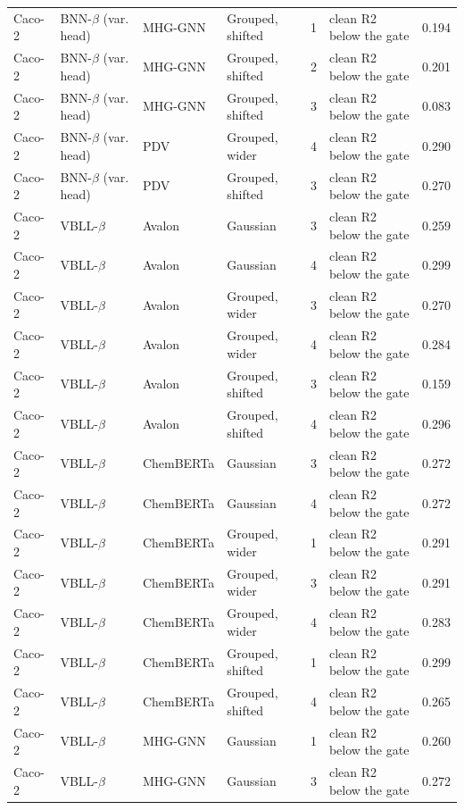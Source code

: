 {\begin{longtable}{llllcll}
Caco-2 & BNN-$\beta$ (var. head) & MHG-GNN & Grouped, shifted & 1 & clean R2 below the gate & 0.194 \\
Caco-2 & BNN-$\beta$ (var. head) & MHG-GNN & Grouped, shifted & 2 & clean R2 below the gate & 0.201 \\
Caco-2 & BNN-$\beta$ (var. head) & MHG-GNN & Grouped, shifted & 3 & clean R2 below the gate & 0.083 \\
Caco-2 & BNN-$\beta$ (var. head) & PDV & Grouped, wider & 4 & clean R2 below the gate & 0.290 \\
Caco-2 & BNN-$\beta$ (var. head) & PDV & Grouped, shifted & 3 & clean R2 below the gate & 0.270 \\
Caco-2 & VBLL-$\beta$ & Avalon & Gaussian & 3 & clean R2 below the gate & 0.259 \\
Caco-2 & VBLL-$\beta$ & Avalon & Gaussian & 4 & clean R2 below the gate & 0.299 \\
Caco-2 & VBLL-$\beta$ & Avalon & Grouped, wider & 3 & clean R2 below the gate & 0.270 \\
Caco-2 & VBLL-$\beta$ & Avalon & Grouped, wider & 4 & clean R2 below the gate & 0.284 \\
Caco-2 & VBLL-$\beta$ & Avalon & Grouped, shifted & 3 & clean R2 below the gate & 0.159 \\
Caco-2 & VBLL-$\beta$ & Avalon & Grouped, shifted & 4 & clean R2 below the gate & 0.296 \\
Caco-2 & VBLL-$\beta$ & ChemBERTa & Gaussian & 3 & clean R2 below the gate & 0.272 \\
Caco-2 & VBLL-$\beta$ & ChemBERTa & Gaussian & 4 & clean R2 below the gate & 0.272 \\
Caco-2 & VBLL-$\beta$ & ChemBERTa & Grouped, wider & 1 & clean R2 below the gate & 0.291 \\
Caco-2 & VBLL-$\beta$ & ChemBERTa & Grouped, wider & 3 & clean R2 below the gate & 0.291 \\
Caco-2 & VBLL-$\beta$ & ChemBERTa & Grouped, wider & 4 & clean R2 below the gate & 0.283 \\
Caco-2 & VBLL-$\beta$ & ChemBERTa & Grouped, shifted & 1 & clean R2 below the gate & 0.299 \\
Caco-2 & VBLL-$\beta$ & ChemBERTa & Grouped, shifted & 4 & clean R2 below the gate & 0.265 \\
Caco-2 & VBLL-$\beta$ & MHG-GNN & Gaussian & 1 & clean R2 below the gate & 0.260 \\
Caco-2 & VBLL-$\beta$ & MHG-GNN & Gaussian & 3 & clean R2 below the gate & 0.272 \\

\end{longtable}}
